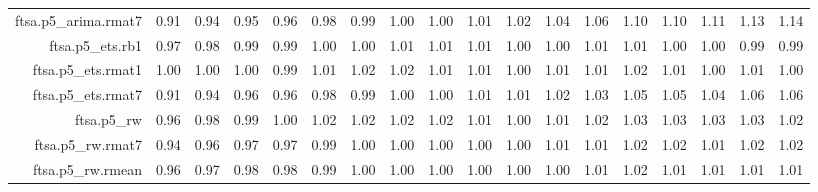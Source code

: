 \begin{tabular}{rrrrrrrrrrrrrrrrrr}
  ftsa.p5\_arima.rmat7 & 0.91 & 0.94 & 0.95 & 0.96 & 0.98 & 0.99 & 1.00 & 1.00 & 1.01 & 1.02 & 1.04 & 1.06 & 1.10 & 1.10 & 1.11 & 1.13 & 1.14 \\ 
  ftsa.p5\_ets.rb1 & 0.97 & 0.98 & 0.99 & 0.99 & 1.00 & 1.00 & 1.01 & 1.01 & 1.01 & 1.00 & 1.00 & 1.01 & 1.01 & 1.00 & 1.00 & 0.99 & 0.99 \\ 
  ftsa.p5\_ets.rmat1 & 1.00 & 1.00 & 1.00 & 0.99 & 1.01 & 1.02 & 1.02 & 1.01 & 1.01 & 1.00 & 1.01 & 1.01 & 1.02 & 1.01 & 1.00 & 1.01 & 1.00 \\ 
  ftsa.p5\_ets.rmat7 & 0.91 & 0.94 & 0.96 & 0.96 & 0.98 & 0.99 & 1.00 & 1.00 & 1.01 & 1.01 & 1.02 & 1.03 & 1.05 & 1.05 & 1.04 & 1.06 & 1.06 \\ 
  ftsa.p5\_rw & 0.96 & 0.98 & 0.99 & 1.00 & 1.02 & 1.02 & 1.02 & 1.02 & 1.01 & 1.00 & 1.01 & 1.02 & 1.03 & 1.03 & 1.03 & 1.03 & 1.02 \\ 
  ftsa.p5\_rw.rmat7 & 0.94 & 0.96 & 0.97 & 0.97 & 0.99 & 1.00 & 1.00 & 1.00 & 1.00 & 1.00 & 1.01 & 1.01 & 1.02 & 1.02 & 1.01 & 1.02 & 1.02 \\ 
  ftsa.p5\_rw.rmean & 0.96 & 0.97 & 0.98 & 0.98 & 0.99 & 1.00 & 1.00 & 1.00 & 1.00 & 1.00 & 1.00 & 1.01 & 1.02 & 1.01 & 1.01 & 1.01 & 1.01 \\ 
   \hline
\end{tabular}

